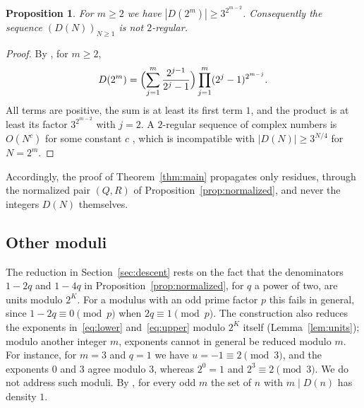 \documentclass{amsart}
\newtheorem{proposition}[theorem]{Proposition}
\theoremstyle{definition}
\theoremstyle{remark}
\numberwithin{equation}{section}
\begin{document}
\begin{proposition}\label{prop:notregular}
For $m\ge2$ we have $|D(2^m)|\ge 3^{2^{m-2}}$. Consequently the sequence $(D(N))_{N\ge1}$ is not $2$-regular.
\end{proposition}

\begin{proof}
By \cite[Proposition~4.5]{SU}, for $m\ge2$,
\[
D(2^m)=\Bigl(\sum_{j=1}^m\frac{2^{j-1}}{2^j-1}\Bigr)\prod_{j=1}^m(2^j-1)^{2^{m-j}}.
\]
All terms are positive, the sum is at least its first term $1$, and the product is at least its factor $3^{2^{m-2}}$ with $j=2$. A $2$-regular sequence of complex numbers is $O(N^c)$ for some constant $c$ \cite[Theorem~2.10]{AS92}, which is incompatible with $|D(N)|\ge3^{N/4}$ for $N=2^m$.
\end{proof}

Accordingly, the proof of Theorem~\ref{thm:main} propagates only residues, through the normalized pair $(Q,R)$ of Proposition~\ref{prop:normalized}, and never the integers $D(N)$ themselves.

\subsection{Other moduli}
The reduction in Section~\ref{sec:descent} rests on the fact that the denominators $1-2q$ and $1-4q$ in Proposition~\ref{prop:normalized}, for $q$ a power of two, are units modulo $2^K$. For a modulus with an odd prime factor $p$ this fails in general, since $1-2q\equiv0\pmod p$ when $2q\equiv1\pmod p$. The construction also reduces the exponents in~\eqref{eq:lower} and~\eqref{eq:upper} modulo $2^K$ itself (Lemma~\ref{lem:units}); modulo another integer $m$, exponents cannot in general be reduced modulo $m$. For instance, for $m=3$ and $q=1$ we have $u=-1\equiv2\pmod 3$, and the exponents $0$ and $3$ agree modulo $3$, whereas $2^0=1$ and $2^3\equiv2\pmod 3$. We do not address such moduli. By \cite[Corollary~4.16]{SU}, for every odd $m$ the set of $n$ with $m\mid D(n)$ has density $1$.
\end{document}
